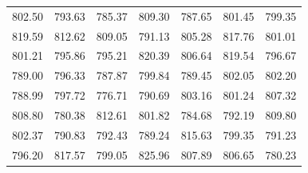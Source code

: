 \begin{description}[noitemsep]
\begin{description}[noitemsep]
\begin{table}[H]
\begin{center}
\begin{xtabular}[t]{|l|l|l|l|l|l|l|}
        802.50 &
        793.63 &
        785.37 &
        809.30 &
        787.65 &
        801.45 &
        799.35%
     \tabularnewline{}
        819.59 &
        812.62 &
        809.05 &
        791.13 &
        805.28 &
        817.76 &
        801.01%
     \tabularnewline{}
        801.21 &
        795.86 &
        795.21 &
        820.39 &
        806.64 &
        819.54 &
        796.67%
     \tabularnewline{}
        789.00 &
        796.33 &
        787.87 &
        799.84 &
        789.45 &
        802.05 &
        802.20%
     \tabularnewline{}
        788.99 &
        797.72 &
        776.71 &
        790.69 &
        803.16 &
        801.24 &
        807.32%
     \tabularnewline{}
        808.80 &
        780.38 &
        812.61 &
        801.82 &
        784.68 &
        792.19 &
        809.80%
     \tabularnewline{}
        802.37 &
        790.83 &
        792.43 &
        789.24 &
        815.63 &
        799.35 &
        791.23%
     \tabularnewline{}
        796.20 &
        817.57 &
        799.05 &
        825.96 &
        807.89 &
        806.65 &
        780.23%
     \tabularnewline{}

\end{xtabular}
\end{center}
\end{table}
\end{description}
\end{description}
